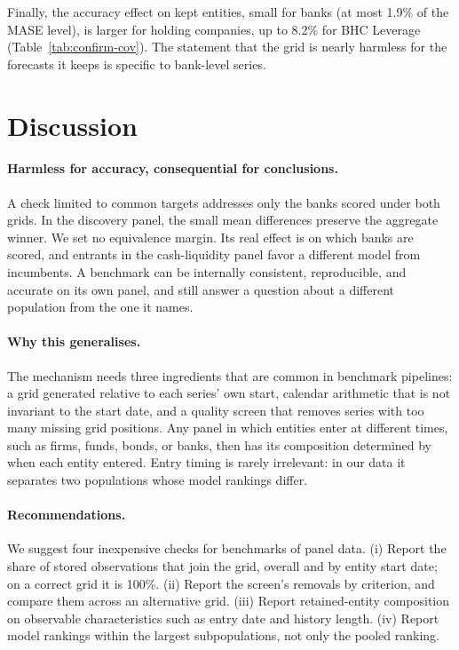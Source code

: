 \documentclass[11pt]{article}
\begin{document}
Finally, the accuracy effect on kept entities, small for banks (at most 1.9\% of the MASE level), is larger for holding companies, up to 8.2\% for BHC Leverage (Table~\ref{tab:confirm-cov}). The statement that the grid is nearly harmless for the forecasts it keeps is specific to bank-level series.

\section{Discussion}
\paragraph{Harmless for accuracy, consequential for conclusions.} A check limited to common targets addresses only the banks scored under both grids. In the discovery panel, the small mean differences preserve the aggregate winner. We set no equivalence margin. Its real effect is on which banks are scored, and entrants in the cash-liquidity panel favor a different model from incumbents. A benchmark can be internally consistent, reproducible, and accurate on its own panel, and still answer a question about a different population from the one it names.

\paragraph{Why this generalises.} The mechanism needs three ingredients that are common in benchmark pipelines: a grid generated relative to each series' own start, calendar arithmetic that is not invariant to the start date, and a quality screen that removes series with too many missing grid positions. Any panel in which entities enter at different times, such as firms, funds, bonds, or banks, then has its composition determined by when each entity entered. Entry timing is rarely irrelevant: in our data it separates two populations whose model rankings differ.

\paragraph{Recommendations.} We suggest four inexpensive checks for benchmarks of panel data. (i) Report the share of stored observations that join the grid, overall and by entity start date; on a correct grid it is 100\%. (ii) Report the screen's removals by criterion, and compare them across an alternative grid. (iii) Report retained-entity composition on observable characteristics such as entry date and history length. (iv) Report model rankings within the largest subpopulations, not only the pooled ranking.
\end{document}
